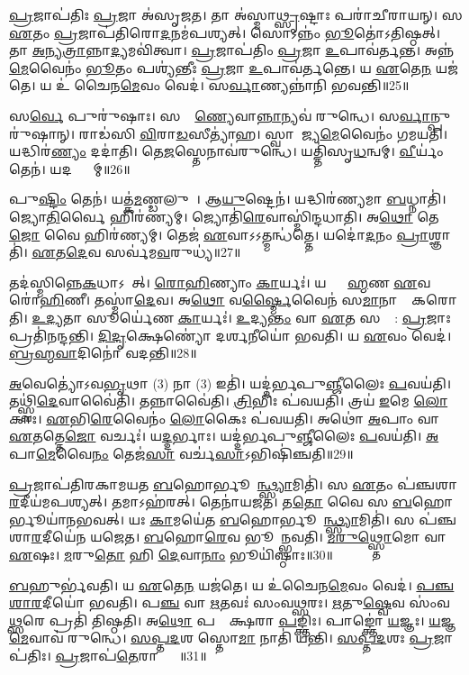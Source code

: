 \ul{𑌪𑍍𑌰}𑌜𑌾𑌪॑𑌤𑌿𑌃 \ul{𑌪𑍍𑌰}𑌜𑌾 𑌅॑𑌸𑍃𑌜𑌤।
𑌤𑌾 𑌅॑𑌸𑍍𑌮𑌾\ul{𑌥𑍍𑌸𑍃}𑌷𑍍𑌟𑌾𑌃 𑌪𑌰𑌾॑𑌚𑍀𑌰𑌾𑌯𑌨𑍍।
𑌸 \ul{𑌏}𑌤𑌂 \ul{𑌪𑍍𑌰}𑌜𑌾𑌪॑𑌤𑌿𑌰𑍋\ul{𑌦}𑌨𑌮॑𑌪𑌶𑍍𑌯𑌤𑍍।
𑌸𑍋𑌽𑌨𑍍𑌨𑌂॑ \ul{𑌭𑍂}𑌤𑍋॑\-𑌽𑌤𑌿𑌷𑍍𑌠𑌤𑍍।
𑌤𑌾 \ul{𑌅}𑌨𑍍𑌯\ul{𑌤𑍍𑌰𑌾}𑌨𑍍𑌨𑌾\ul{𑌦𑍍𑌯}𑌮𑌵𑌿॑𑌤𑍍𑌵𑌾।
\ul{𑌪𑍍𑌰}𑌜𑌾𑌪॑𑌤𑌿𑌂 \ul{𑌪𑍍𑌰}𑌜𑌾 \ul{𑌉}𑌪𑌾𑌵॑𑌰𑍍𑌤𑌨𑍍𑌤।
𑌅𑌨𑍍𑌨॑\ul{𑌮𑍇}𑌵𑍈𑌨𑌂॑ \ul{𑌭𑍂}𑌤𑌂 𑌪𑌶𑍍𑌯॑𑌨𑍍𑌤𑍀𑌃 \ul{𑌪𑍍𑌰}𑌜𑌾 \ul{𑌉}𑌪𑌾𑌵॑𑌰𑍍𑌤𑌨𑍍𑌤𑍇।
𑌯 \ul{𑌏}𑌤𑍇\ul{𑌨} 𑌯𑌜॑𑌤𑍇।
𑌯 𑌉॑ 𑌚𑍈𑌨\ul{𑌮𑍇}𑌵𑌂 𑌵𑍇𑌦॑।
𑌸\ul{𑌰𑍍𑌵𑌾}𑌣𑍍𑌯𑌨𑍍𑌨𑌾॑𑌨𑌿 𑌭𑌵𑌨𑍍𑌤𑌿॥25॥

𑌸\ul{𑌰𑍍𑌵𑍇} 𑌪𑍁𑌰𑍁॑𑌷𑌾𑌃।
𑌸𑌰𑍍𑌵𑌾᳚\ul{𑌣𑍍𑌯𑍇}𑌵𑌾\ul{𑌨𑍍𑌨𑌾}𑌨𑍍𑌯𑌵॑ 𑌰𑍁𑌨𑍍𑌧𑍇।
𑌸\ul{𑌰𑍍𑌵𑌾}𑌨𑍍𑌪𑍁𑌰𑍁॑𑌷𑌾𑌨𑍍।
𑌰𑌾𑌡॑𑌸𑌿 \ul{𑌵𑌿}𑌰𑌾\ul{𑌡}𑌸𑍀𑌤𑍍𑌯𑌾॑𑌹।
𑌸𑍍𑌵𑌾𑌰𑌾᳚𑌜𑍍𑌯\ul{𑌮𑍇}𑌵𑍈𑌨𑌂॑ 𑌗𑌮𑌯𑌤𑌿।
𑌯𑌦𑍍𑌧𑌿𑌰॑\ul{𑌣𑍍𑌯𑌂} 𑌦𑌦𑌾॑𑌤𑌿।
𑌤𑍇\ul{𑌜}𑌸𑍍𑌤𑍇𑌨𑌾𑌵॑𑌰𑍁𑌨𑍍𑌧𑍇।
𑌯𑌤𑍍𑌤𑌿॑𑌸𑍃\ul{𑌧}𑌨𑍍𑌵𑌮𑍍।
\ul{𑌵𑍀}𑌰𑍍𑌯𑌂॑ 𑌤𑍇𑌨॑।
𑌯𑌦𑌷𑍍𑌟𑍍𑌰𑌾᳚𑌮𑍍॥26॥

𑌪𑍁\ul{𑌷𑍍𑌟𑌿𑌂} 𑌤𑍇𑌨॑।
𑌯𑌤𑍍𑌕॑\ul{𑌮}𑌣𑍍𑌡𑌲𑍁𑌮𑍍᳚।
𑌆\ul{𑌯𑍁}𑌷𑍍𑌟𑍇𑌨॑।
𑌯𑌦𑍍𑌧𑌿𑌰॑𑌣𑍍𑌯𑌮𑌾 \ul{𑌬}𑌧𑍍𑌨𑌾𑌤𑌿॑।
𑌜𑍍𑌯𑍋\ul{𑌤𑌿}𑌰𑍍𑌵𑍈 𑌹𑌿𑌰॑𑌣𑍍𑌯𑌮𑍍।
𑌜𑍍𑌯𑍋𑌤𑌿॑\ul{𑌰𑍇}𑌵𑌾𑌸𑍍𑌮𑌿॑𑌨𑍍𑌦𑌧𑌾𑌤𑌿।
𑌅\ul{𑌥𑍋} 𑌤𑍇\ul{𑌜𑍋} 𑌵𑍈 𑌹𑌿𑌰॑𑌣𑍍𑌯𑌮𑍍।
𑌤𑍇𑌜॑ \ul{𑌏}𑌵𑌾𑌽𑌽𑌤𑍍𑌮𑌨𑍍𑌧॑𑌤𑍍𑌤𑍇।
𑌯𑌦𑍋॑\ul{𑌦}𑌨𑌂 \ul{𑌪𑍍𑌰𑌾}𑌶𑍍𑌞𑌾𑌤𑌿॑।
\ul{𑌏}𑌤\ul{𑌦𑍇}𑌵 𑌸𑌰𑍍𑌵॑𑌮\ul{𑌵}𑌰𑍁𑌧𑍍𑌯॑॥27॥

𑌤𑌦॑𑌸𑍍𑌮𑌿𑌨𑍍𑌨𑍇\ul{𑌕}𑌧𑌾\-𑌽𑌧𑌾᳚𑌤𑍍।
\ul{𑌰𑍋}\ul{𑌹𑌿}𑌣𑍍𑌯𑌾𑌂 \ul{𑌕𑌾}𑌰𑍍𑌯𑌃॑।
𑌯𑌦𑍍𑌬𑍍𑌰𑌾᳚\ul{𑌹𑍍𑌮}𑌣 \ul{𑌏}𑌵 𑌰𑍋॑\ul{𑌹𑌿}𑌣𑍀।
𑌤𑌸𑍍𑌮𑌾॑\ul{𑌦𑍇}𑌵।
𑌅\ul{𑌥𑍋} 𑌵\ul{𑌰𑍍𑌷𑍍𑌮𑍈}𑌵𑍈𑌨॑ 𑌸\ul{𑌮𑌾}𑌨𑌾𑌨𑌾𑌂᳚ 𑌕𑌰𑍋𑌤𑌿।
\ul{𑌉}\ul{𑌦𑍍𑌯}𑌤𑌾 𑌸𑍂𑌰𑍍𑌯𑍇॑𑌣 \ul{𑌕𑌾}𑌰𑍍𑌯𑌃॑।
\ul{𑌉}𑌦𑍍𑌯\ul{𑌨𑍍𑌤𑌂} 𑌵𑌾 \ul{𑌏}𑌤 𑌸𑌰𑍍𑌵𑌾᳚: \ul{𑌪𑍍𑌰}𑌜𑌾𑌃 𑌪𑍍𑌰𑌤𑌿॑\-𑌨𑌨𑍍𑌦𑌨𑍍𑌤𑌿।
\ul{𑌦𑌿}\ul{𑌦𑍃}𑌕𑍍𑌷𑍇𑌣𑍍𑌯𑍋॑ 𑌦𑌰𑍍\mbox{}\ul{𑌶}𑌨𑍀𑌯𑍋॑ 𑌭𑌵𑌤𑌿।
𑌯 \ul{𑌏}𑌵𑌂 𑌵𑍇𑌦॑।
\ul{𑌬𑍍𑌰}\ul{𑌹𑍍𑌮}\ul{𑌵𑌾}𑌦𑌿𑌨𑍋॑ 𑌵𑌦𑌨𑍍𑌤𑌿॥28॥

\ul{𑌅}𑌵𑍇𑌤𑍍𑌯𑍋॑\-𑌽𑌵\ul{𑌭𑍃}𑌥𑌾 (3) 𑌨𑌾 (3) 𑌇𑌤𑌿॑।
𑌯𑌦𑍍𑌦॑𑌰𑍍𑌭𑌪𑍁\ul{𑌞𑍍𑌜𑍀}𑌲𑍈𑌃 \ul{𑌪}𑌵𑌯॑𑌤𑌿।
𑌤𑌥𑍍𑌸𑍍𑌵𑌿॑\ul{𑌦𑍇}𑌵𑌾𑌵𑍈॑𑌤𑌿।
𑌤𑌨𑍍𑌨𑌾𑌵𑍈॑𑌤𑌿।
\ul{𑌤𑍍𑌰𑌿}𑌭𑌿𑌃 𑌪॑𑌵𑌯𑌤𑌿।
𑌤𑍍𑌰𑌯॑ \ul{𑌇}𑌮𑍇 \ul{𑌲𑍋}𑌕𑌾𑌃।
\ul{𑌏}𑌭𑌿\ul{𑌰𑍇}𑌵𑍈𑌨𑌂॑ \ul{𑌲𑍋}𑌕𑍈𑌃 𑌪॑𑌵𑌯𑌤𑌿।
𑌅𑌥𑍋॑ \ul{𑌅}𑌪𑌾𑌂 𑌵𑌾 \ul{𑌏}𑌤𑌤𑍍𑌤𑍇\ul{𑌜𑍋} 𑌵𑌰𑍍𑌚𑌃॑।
𑌯\ul{𑌦𑍍𑌦}𑌰𑍍𑌭𑌾𑌃।
𑌯𑌦𑍍𑌦॑𑌰𑍍𑌭𑌪𑍁\ul{𑌞𑍍𑌜𑍀}𑌲𑍈𑌃 \ul{𑌪}𑌵𑌯॑𑌤𑌿।
\ul{𑌅}𑌪𑌾\ul{𑌮𑍇}𑌵𑍈\ul{𑌨𑌂} 𑌤𑍇𑌜॑\ul{𑌸𑌾} 𑌵𑌰𑍍𑌚॑\ul{𑌸𑌾}\-𑌽𑌭𑌿𑌷𑌿॑𑌞𑍍𑌚𑌤𑌿॥29॥\anuvakamend[\ul{𑌭}\ul{𑌵}𑌨𑍍𑌤𑍍𑌯𑌷𑍍𑌟𑍍𑌰𑌾॑𑌮\ul{𑌵}𑌰𑍁𑌧𑍍𑌯॑ 𑌵𑌦𑌨𑍍𑌤𑌿 \ul{𑌦}𑌰𑍍𑌭𑌾 𑌯𑌦𑍍𑌦॑𑌰𑍍𑌭𑌪𑍁\ul{𑌞𑍍𑌜𑍀}𑌲𑍈𑌃 \ul{𑌪}𑌵\ul{𑌯}𑌤𑍍𑌯𑍇𑌕𑌂॑ 𑌚]

\ul{𑌪𑍍𑌰}𑌜𑌾𑌪॑𑌤𑌿𑌰𑌕𑌾𑌮𑌯𑌤 \ul{𑌬}𑌹𑍋𑌰𑍍𑌭𑍂𑌯𑌾᳚\ul{𑌨𑍍𑌥𑍍𑌸𑍍𑌯𑌾}𑌮𑌿𑌤𑌿॑।
𑌸 \ul{𑌏}𑌤𑌂 𑌪॑𑌞𑍍𑌚𑌶𑌾\ul{𑌰}𑌦𑍀𑌯॑𑌮𑌪𑌶𑍍𑌯𑌤𑍍।
𑌤𑌮𑌾𑌽𑌹॑𑌰𑌤𑍍।
𑌤𑍇𑌨𑌾॑𑌯𑌜𑌤।
𑌤\ul{𑌤𑍋} 𑌵𑍈 𑌸 \ul{𑌬}𑌹𑍋𑌰𑍍𑌭𑍂𑌯𑌾॑𑌨𑌭𑌵𑌤𑍍।
𑌯𑌃 \ul{𑌕𑌾}𑌮𑌯𑍇॑𑌤 \ul{𑌬}𑌹𑍋𑌰𑍍𑌭𑍂𑌯𑌾᳚\ul{𑌨𑍍𑌥𑍍𑌸𑍍𑌯𑌾}𑌮𑌿𑌤𑌿॑।
𑌸 𑌪॑𑌞𑍍𑌚𑌶𑌾\ul{𑌰}𑌦𑍀𑌯𑍇॑𑌨 𑌯𑌜𑍇𑌤।
\ul{𑌬}𑌹𑍋\ul{𑌰𑍇}𑌵 𑌭𑍂𑌯𑌾᳚𑌨𑍍𑌭𑌵𑌤𑌿।
\ul{𑌮}\ul{𑌰𑍁}\ul{𑌥𑍍𑌸𑍍𑌤𑍋}𑌮𑍋 𑌵𑌾 \ul{𑌏}𑌷𑌃।
\ul{𑌮}𑌰𑍁\ul{𑌤𑍋} 𑌹𑌿 \ul{𑌦𑍇}𑌵𑌾\ul{𑌨𑌾𑌂} 𑌭𑍂𑌯𑌿॑𑌷𑍍𑌠𑌾𑌃॥30॥

\ul{𑌬}𑌹𑍁𑌰𑍍𑌭॑𑌵𑌤𑌿।
𑌯 \ul{𑌏}𑌤𑍇\ul{𑌨} 𑌯𑌜॑𑌤𑍇।
𑌯 𑌉॑𑌚𑍈𑌨\ul{𑌮𑍇}𑌵𑌂 𑌵𑍇𑌦॑।
\ul{𑌪}\ul{𑌞𑍍𑌚}\ul{𑌶𑌾}\ul{𑌰}𑌦𑍀𑌯𑍋॑ 𑌭𑌵𑌤𑌿।
𑌪\ul{𑌞𑍍𑌚} 𑌵𑌾 \ul{𑌋}𑌤𑌵𑌃॑ 𑌸𑌂𑌵\ul{𑌥𑍍𑌸}𑌰𑌃।
\ul{𑌋}𑌤𑍁\ul{𑌷𑍍𑌵𑍇}𑌵 𑌸𑌂॑𑌵\ul{𑌥𑍍𑌸}𑌰𑍇 𑌪𑍍𑌰𑌤𑌿॑ 𑌤𑌿𑌷𑍍𑌠𑌤𑌿।
𑌅\ul{𑌥𑍋} 𑌪𑌞𑍍𑌚𑌾᳚𑌕𑍍𑌷𑌰𑌾 \ul{𑌪}𑌙𑍍𑌕𑍍𑌤𑌿𑌃।
𑌪𑌾𑌙𑍍𑌕𑍍𑌤𑍋॑ \ul{𑌯}𑌜𑍍𑌞𑌃।
\ul{𑌯}𑌜𑍍𑌞\ul{𑌮𑍇}𑌵𑌾𑌵॑ 𑌰𑍁𑌨𑍍𑌧𑍇।
\ul{𑌸}\ul{𑌪𑍍𑌤}\ul{𑌦}𑌶 𑌸𑍍𑌤𑍋\ul{𑌮𑌾} 𑌨𑌾𑌤𑌿॑ 𑌯𑌨𑍍𑌤𑌿।
\ul{𑌸}\ul{𑌪𑍍𑌤}\ul{𑌦}𑌶𑌃 \ul{𑌪𑍍𑌰}𑌜𑌾𑌪॑𑌤𑌿𑌃।
\ul{𑌪𑍍𑌰}𑌜𑌾𑌪॑\ul{𑌤𑍇}𑌰𑌾𑌪𑍍𑌤𑍍𑌯𑍈᳚॥31॥\anuvakamend[𑌭𑍂𑌯𑌿॑𑌷𑍍𑌠𑌾 𑌯\ul{𑌨𑍍𑌤𑌿} 𑌦𑍍𑌵𑍇 𑌚॑]

